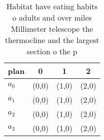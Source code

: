 \documentclass[a4paper]{article}
\begin{document}
\begin{table}
\begin{adjustbox}{width=0.6\columnwidth}
\begin{tabular}{|l|l|l|l|}
\hline
\textbf{plan} & \multicolumn{1}{c|}{\textbf{0}} & \multicolumn{1}{c|}{\textbf{1}} & \multicolumn{1}{c|}{\textbf{2}} \\ \hline
\textbf{$a_0$}  & (0,0) & (1,0) & (2,0) \\ \hline
\textbf{$a_1$}  & (0,0) & (1,0) & (2,0) \\ \hline
\textbf{$a_2$}  & (0,0) & (1,0) & (2,0) \\ \hline
\textbf{$a_3$}  & (0,0) & (1,0) & (2,0) \\ \hline
\end{tabular}
\end{adjustbox}
\caption{Habitat have eating habits o adults and over miles Millimeter telescope the thermocline and the largest section o the p
}
\end{table}
\end{document}
